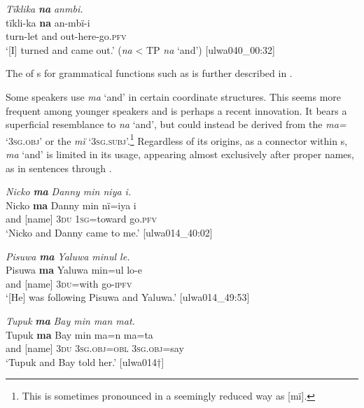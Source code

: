 \ea%
    \label{ex:complex:35}
          \textit{Tïklika} \textbf{\textit{na}} \textit{anmbi.}\\
\gll    tïkli-ka  \textbf{na}  an-mbï-i\\
    turn-let  and  out-here-go.\textsc{pfv}\\
\glt `[I] turned and came out.’ (\textit{na} < TP \textit{na} ‘and’) [ulwa040\_00:32]
\z

The  of  s for grammatical functions such as  is further described in .

  Some speakers use \textit{ma} ‘and’ in certain coordinate structures. This seems more frequent among younger speakers and is perhaps a recent innovation. It bears a superficial resemblance to  \textit{na} ‘and’, but could instead be derived from the  \textit{ma=} ‘\textsc{3sg.obj}’ or the  \textit{mï} ‘\textsc{3sg.subj}’.\footnote{This  is sometimes pronounced in a seemingly reduced way as [mï].} Regardless of its origins, as a connector within s, \textit{ma} ‘and’ is limited in its usage, appearing almost exclusively after proper names, as in sentences  through .

\ea%
    \label{ex:complex:36}
          \textit{Nicko} \textbf{\textit{ma}} \textit{Danny min niya i.}\\
\gll    Nicko  \textbf{ma}  Danny  min  nï=iya      i\\
    [name]  and  [name]  3\textsc{du}  \textsc{1sg=}toward  go.\textsc{pfv}\\
\glt `Nicko and Danny came to me.’ [ulwa014\_40:02]
\z

\ea%
    \label{ex:complex:37}
          \textit{Pisuwa} \textbf{\textit{ma}} \textit{Yaluwa minul le.}\\
\gll    Pisuwa  \textbf{ma}  Yaluwa  min=ul    lo-e\\
    [name]  and  [name]    3\textsc{du}=with  go-\textsc{ipfv}\\
\glt `[He] was following Pisuwa and Yaluwa.’ [ulwa014\_49:53]
\z

\ea%
    \label{ex:complex:38}
          \textit{Tupuk} \textbf{\textit{ma}} \textit{Bay min man mat.}\\
\gll    Tupuk  \textbf{ma}  Bay    min  ma=n      ma=ta\\
    [name]  and  [name]    3\textsc{du}  3\textsc{sg.obj=obl}  \textsc{3sg.obj}=say\\
\glt `Tupuk and Bay told her.’ [ulwa014†]
\z

